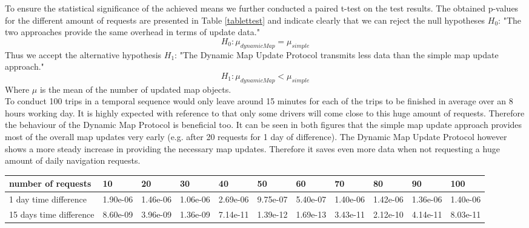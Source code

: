 To ensure the statistical significance of the achieved means we further conducted a paired t-test on the test results. The obtained p-values for the different amount of requests are presented in Table \ref{tablettest} and indicate clearly that we can reject the null hypotheses $H_{0}$: "The two approaches provide the same overhead in terms of update data."
\begin{equation}
H_0: \mu_{dynamicMap} = \mu_{simple}
\end{equation} 
Thus we accept the alternative hypothesis  $H_1$: "The Dynamic Map Update Protocol transmits less data than the simple map update approach." 
\begin{equation}
H_1: \mu_{dynamicMap} < \mu_{simple}
\end{equation}
Where $\mu$ is the mean of the number of updated map objects.\\ 
To conduct 100 trips in a temporal sequence would only leave around 15 minutes for each of the trips to be finished in average over an 8 hours working day. It is highly expected with reference to \cite{pasaoglu_driving_2012} that only some drivers will come close to this huge amount of requests. Therefore the behaviour of the Dynamic Map Protocol is beneficial too. It can be seen in both figures that the simple map update approach provides most of the overall map updates very early (e.g. after 20 requests for 1 day of difference). The Dynamic Map Update Protocol however shows a more steady increase in providing the necessary map updates. Therefore it saves even more data when not requesting a huge amount of daily navigation requests.\\


\begin{table*}
\caption{Obtained p-values of the paired t-test for the results of the second test.}
\begin{scriptsize}
\centering
\begin{tabular}
{p{1.5cm}p{1cm}p{1cm}p{1cm}p{1cm}p{1cm}p{1cm}p{1cm}p{1cm}p{1cm}p{1cm}}
number of requests&	10  & 20  & 30  & 40 & 50 & 60 & 70 & 80 & 90 & 100 \\ 
\hline 
1 day time difference & 1.90e-06 & 1.46e-06 & 1.06e-06 & 2.69e-06 & 9.75e-07 & 5.40e-07 & 1.40e-06 & 1.42e-06 & 1.36e-06 & 1.40e-06 \\ 
\hline 
15 days time difference &	8.60e-09 & 3.96e-09& 1.36e-09 &7.14e-11& 1.39e-12 &1.69e-13 &3.43e-11 &2.12e-10 &4.14e-11 &8.03e-11 \\
\end{tabular}
\end{scriptsize}
\label{tablettest}
\end{table*}





